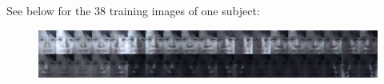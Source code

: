 See below for the 38 training images of one subject:
\begin{figure}[h]
\centering
\includegraphics[width=\textwidth]{figures_pami/training.png}
\end{figure}




